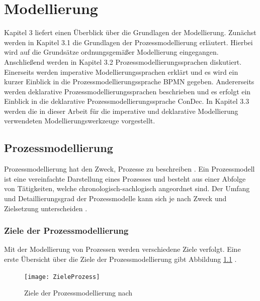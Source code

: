 
\chapter{Modellierung}\label{sec:chapter3}
Kapitel 3 liefert einen Überblick über die Grundlagen der Modellierung. Zunächst werden in Kapitel 3.1 die Grundlagen der Prozessmodellierung erläutert. Hierbei wird auf die Grundsätze ordnungsgemäßer Modellierung eingegangen. Anschließend werden in Kapitel 3.2 Prozessmodellierungssprachen diskutiert. Einerseits werden imperative Modellierungssprachen erklärt und es wird ein kurzer Einblick in die Prozessmodellierungssprache BPMN gegeben. Andererseits werden deklarative Prozessmodellierungssprachen beschrieben und es erfolgt ein Einblick in die deklarative Prozessmodellierungssprache ConDec. In Kapitel 3.3 werden die in dieser Arbeit für die imperative und deklarative Modellierung verwendeten Modellierungswerkzeuge vorgestellt.

\section{Prozessmodellierung}\label{sec:chapter3:Prozessmodellierung}

Prozessmodellierung hat den Zweck, Prozesse zu beschreiben \cite{fahland2010}. Ein Prozessmodell ist eine vereinfachte Darstellung eines Prozesses und besteht aus einer Abfolge von Tätigkeiten, welche chronologisch-sachlogisch angeordnet sind. Der Umfang und Detaillierungsgrad der Prozessmodelle kann sich je nach Zweck und Zielsetzung unterscheiden \cite{koch2011}.

\subsection{Ziele der Prozessmodellierung}
Mit der Modellierung von Prozessen werden verschiedene Ziele verfolgt. Eine erste Übersicht über die Ziele der Prozessmodellierung gibt Abbildung \ref{fig:ZieleProzess} \cite{koch2011}.
\begin{figure}[htp]
\begin{center}
  \texttt{[image: ZieleProzess]} %
  \caption{Ziele der Prozessmodellierung nach \cite{koch2011}}
  \label{fig:ZieleProzess}
\end{center}
\end{figure}

